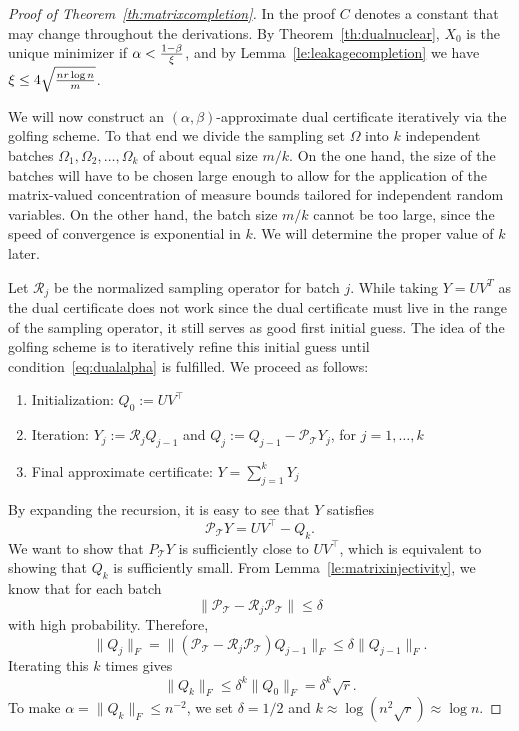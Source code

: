 \begin{proof}[Proof of Theorem~\ref{th:matrixcompletion}]
In the proof $C$ denotes a constant that may change throughout  the derivations.
By Theorem~\ref{th:dualnuclear}, $X_0$ is the unique minimizer if $\alpha < \frac{1-\beta}{\xi}$, and 
by Lemma~\ref{le:leakagecompletion} we have
$\xi \le  4\sqrt{\frac{ n r \log n}{m}}$.

We will now construct an $(\alpha,\beta)$-approximate dual certificate iteratively via the golfing scheme. To that end we divide the sampling set $\Omega$ into $k$ independent batches $\Omega_1, \Omega_2, \dots, \Omega_k$ of about equal size $m/k$. 
On the one hand, the size of the batches will have
to be chosen large enough to allow for the application of
the matrix-valued concentration of measure bounds tailored for independent
random variables. On the other hand, the batch size $m/k$ cannot be too large, since the speed of convergence is exponential in $k$.
We will determine the proper value of $k$ later.

Let $\mathcal{R}_j$ be the normalized sampling operator for batch $j$.
While taking $Y=UV^T$ as the dual certificate does not work since the dual certificate must live in the range of the sampling operator, it still serves as good first initial guess. The idea of the golfing scheme is to iteratively refine this initial guess until condition~\eqref{eq:dualalpha} is fulfilled.
We proceed as follows:
\begin{enumerate}
\item Initialization: $Q_0 := UV^\top$
\item Iteration: $Y_j := \mathcal{R}_j Q_{j-1}$ and $Q_j := Q_{j-1} - \mathcal{P}_{\mathcal{T}} Y_j$, \quad for $j=1,\dots, k$
\item Final approximate certificate: $Y = \sum_{j=1}^k Y_j$
\end{enumerate}
By expanding the recursion, it is easy to see that $Y$ satisfies
$$\mathcal{P}_{\mathcal{T}} Y = UV^\top - Q_k.$$
We want to show that $P_{\mathcal{T}}Y$ is sufficiently close to $UV^\top$, which is equivalent to showing that $Q_k$ is sufficiently small.
From Lemma~\ref{le:matrixinjectivity}, we know that for each batch
$$\|\mathcal{P}_{\mathcal{T}} - \mathcal{R}_j \mathcal{P}_{\mathcal{T}}\| \le \delta$$
with high probability. Therefore,
$$\|Q_j\|_F = \|(\mathcal{P}_{\mathcal{T}} - \mathcal{R}_j \mathcal{P}_{\mathcal{T}}) Q_{j-1}\|_F \le \delta \|Q_{j-1}\|_F.$$
Iterating this $k$ times gives
$$\|Q_k\|_F \le \delta^k \|Q_0\|_F = \delta^k \sqrt{r}.$$
To make $\alpha = \|Q_k\|_F \le n^{-2}$, we set $\delta = 1/2$ and $k \approx \log(n^2 \sqrt{r}) \approx \log n$.


\end{proof}
